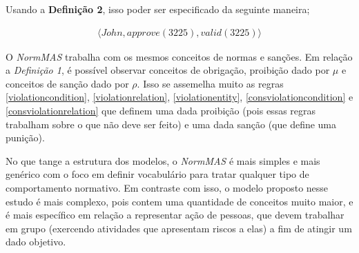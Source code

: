Usando a \textbf{Definição 2}, isso poder ser especificado da seguinte maneira; 

\begin{eqnarray}
    \langle John, approve(3225), valid(3225)\rangle
\end{eqnarray}

O \textit{NormMAS} trabalha com os mesmos conceitos de normas e sanções. Em relação a \textit{Definição 1}, é possível observar conceitos de obrigação, proibição dado por $ \mu $ e 
conceitos de sanção dado por $\rho$. Isso se assemelha muito as regras \ref{violationcondition}, \ref{violationrelation}, \ref{violationentity}, \ref{consviolationcondition} e 
\ref{consviolationrelation} que definem uma dada proibição (pois essas regras trabalham sobre o que não deve ser feito) e uma dada sanção (que define uma punição).

No que tange a estrutura dos modelos, o \textit{NormMAS} é mais simples e mais genérico com o foco em definir vocabulário para tratar qualquer tipo de comportamento normativo. Em 
contraste com isso, o modelo proposto nesse estudo é mais complexo, pois contem uma quantidade de conceitos muito maior, e é mais específico em relação a representar ação de pessoas,
que devem trabalhar em grupo (exercendo atividades que apresentam riscos a elas) a fim de atingir um dado objetivo. 